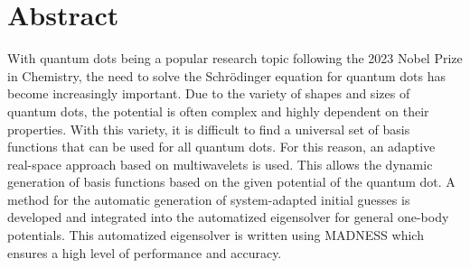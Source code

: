 \chapter*{Abstract}

With quantum dots being a popular research topic following the 2023 Nobel Prize in Chemistry, the need to solve the Schrödinger equation for quantum dots has become increasingly important. 
Due to the variety of shapes and sizes of quantum dots, the potential is often complex and highly dependent on their properties. 
With this variety, it is difficult to find a universal set of basis functions that can be used for all quantum dots. 
For this reason, an adaptive real-space approach based on multiwavelets is used.
This allows the dynamic generation of basis functions based on the given potential of the quantum dot.
A method for the automatic generation of system-adapted initial guesses is developed and integrated into the automatized eigensolver for general one-body potentials.
This automatized eigensolver is written using MADNESS which ensures a high level of performance and accuracy.